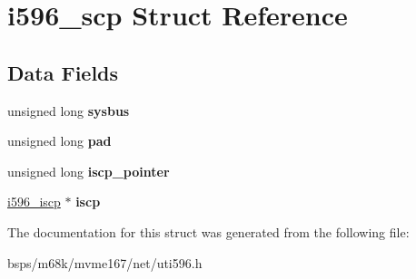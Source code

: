 \hypertarget{structi596__scp}{}\section{i596\+\_\+scp Struct Reference}
\label{structi596__scp}
\subsection*{Data Fields}
\begin{DoxyCompactItemize}
\item 
\mbox{\label{structi596__scp_a9fbbafe225244de3b23a974bc106ce26}} 
unsigned long {\bfseries sysbus}
\item 
\mbox{\label{structi596__scp_a5d37f7625c17efab906d15735a89d4b1}} 
unsigned long {\bfseries pad}
\item 
\mbox{\label{structi596__scp_a096fd715d39d61ecdb4ba97ed4989e3e}} 
unsigned long {\bfseries iscp\+\_\+pointer}
\item 
\mbox{\label{structi596__scp_a4fa794a80e60145bef6ba28477b183b8}} 
\mbox{\hyperlink{structi596__iscp}{i596\+\_\+iscp}} $\ast$ {\bfseries iscp}
\end{DoxyCompactItemize}


The documentation for this struct was generated from the following file\+:\begin{DoxyCompactItemize}
\item 
bsps/m68k/mvme167/net/uti596.\+h\end{DoxyCompactItemize}
